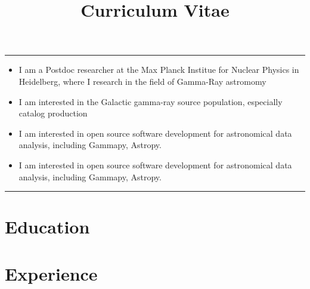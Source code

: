 \documentclass[11pt,a4paper,sans]{moderncv}        %
\title{Curriculum Vitae}                               %
\begin{document}
\makecvtitle

\centering\textcolor{color1}{\rule{16cm}{1pt}}

\begin{multicols}{2}
\begin{itemize}
\item I am a Postdoc researcher at the Max Planck Institue for Nuclear Physics in Heidelberg, where I research in the field of Gamma-Ray astromomy
\item I am interested in the Galactic gamma-ray source population, especially catalog production
\item I am interested in open source software development for astronomical data analysis, including Gammapy, Astropy.
\item I am interested in open source software development for astronomical data analysis, including Gammapy, Astropy.
\end{itemize}
\end{multicols}

\centering\textcolor{color1}{\rule{16cm}{1pt}}

\section{\textbf{Education}}



\section{\textbf{Experience}}
\end{document}
